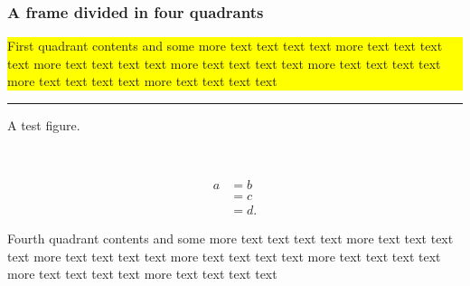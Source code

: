\documentclass[t]{beamer}
\newcommand\FourQuad[4]{
        \vspace*{-0.2cm}
    \colorbox{yellow}{\begin{minipage}[b][.40\textheight][t]{.49\textwidth}#1\end{minipage}}\hfill
    \begin{minipage}[b][.40\textheight][t]{.49\textwidth}#2\end{minipage}\\
    \begin{minipage}[b][.40\textheight][t]{.49\textwidth}#3\end{minipage}\hfill
    \begin{minipage}[b][.40\textheight][t]{.49\textwidth}#4\end{minipage}
}
\begin{document}
\begin{frame}
\frametitle{A frame divided in four quadrants}
\FourQuad%
{First quadrant contents and some more text text text text more text text text text more text text text text more text text text text more text text text text more text text text text more text text text text}%
{
  \centering
  \rule{3cm}{2cm}
  A test figure.
}%
{\begin{align*}
  a &= b \\
  &= c \\
  & = d.
\end{align*}}%
{Fourth quadrant contents and some more text text text text more text text text text more text text text text more text text text text more text text text text more text text text text more text text text text}
\end{frame}
\end{document}
